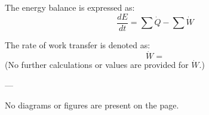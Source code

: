 The energy balance is expressed as:  
\[
\frac{dE}{dt} = \sum \dot{Q} - \sum \dot{W}
\]  

The rate of work transfer is denoted as:  
\[
\dot{W} = 
\]  
(No further calculations or values are provided for \( \dot{W} \).)  

---

No diagrams or figures are present on the page.